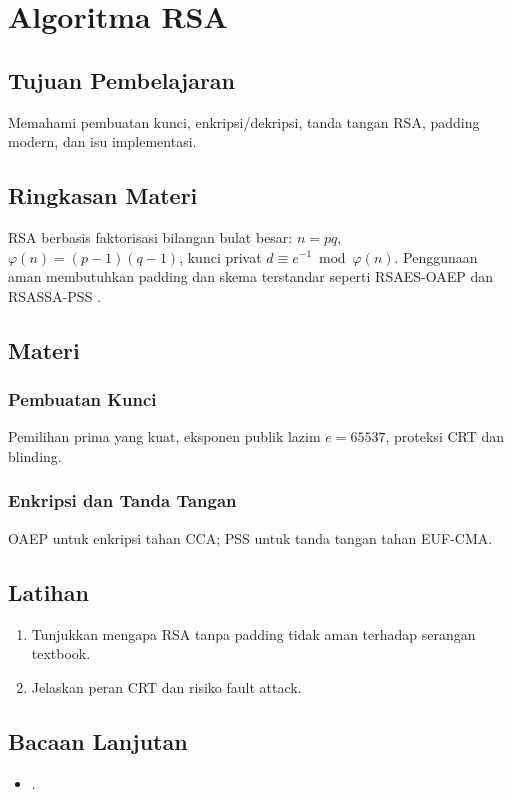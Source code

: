 \documentclass[../main.tex]{subfiles}
\begin{document}
\chapter{Algoritma RSA}
\section{Tujuan Pembelajaran}
Memahami pembuatan kunci, enkripsi/dekripsi, tanda tangan RSA, padding modern, dan isu implementasi.

\section{Ringkasan Materi}
RSA berbasis faktorisasi bilangan bulat besar: \(n=pq\), \(\varphi(n)=(p-1)(q-1)\), kunci privat \(d \equiv e^{-1} \bmod \varphi(n)\). Penggunaan aman membutuhkan padding dan skema terstandar seperti RSAES-OAEP dan RSASSA-PSS \citep{pkcs1v2_2}.

\section{Materi}
\subsection{Pembuatan Kunci}
Pemilihan prima yang kuat, eksponen publik lazim \(e=65537\), proteksi CRT dan blinding.

\subsection{Enkripsi dan Tanda Tangan}
OAEP untuk enkripsi tahan CCA; PSS untuk tanda tangan tahan EUF-CMA.

\section{Latihan}
\begin{enumerate}
  \item Tunjukkan mengapa RSA tanpa padding tidak aman terhadap serangan textbook.
  \item Jelaskan peran CRT dan risiko fault attack.
\end{enumerate}

\section{Bacaan Lanjutan}
\begin{itemize}
  \item \citep{pkcs1v2_2}.
\end{itemize}
\end{document}
